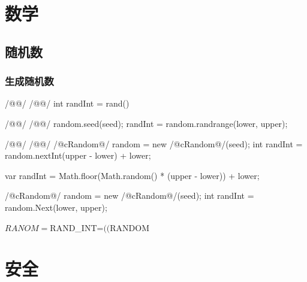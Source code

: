 \documentclass[hidelinks]{ctexart}
\begin{document}



\section{数学} %
\label{sec:数学}

\subsection{随机数} %
\label{sub:随机数}

\subsubsection{生成随机数} %
\label{ssub:生成随机数}

\begin{clst}
/@@/
/@\lhend @/
int randInt = rand() %
\end{clst}
\begin{pylst}
/@@/
/@\lhend @/
random.seed(seed);
randInt = random.randrange(lower, upper);
\end{pylst}
\begin{javalst}
/@@/
/@\lhend @/
/@\+c{Random}@/ random = new /@\+c{Random}@/(seed);
int randInt = random.nextInt(upper - lower) + lower;
\end{javalst}
\begin{jslst}
var randInt = Math.floor(Math.random() * (upper - lower)) + lower;
\end{jslst}
\begin{cshlst}
/@\+c{Random}@/ random = new /@\+c{Random}@/(seed);
int randInt = random.Next(lower, upper);
\end{cshlst}
\begin{shlst}
$RANOM=$$
$RAND_INT=$(($RANDOM%
\end{shlst}




\section{安全} %
\label{sec:安全}
\end{document}
